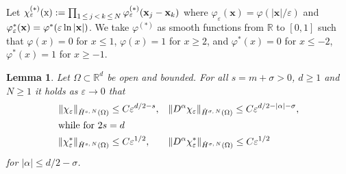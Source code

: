 \documentclass[10pt]{amsart}
\newtheorem{lemm}[theo]{Lemma}\newtheorem{prop}[theo]{Proposition}\newtheorem{coro}[theo]{Corollary}\newtheorem{conj}[theo]{Conjecture}
\theoremstyle{definition}\newtheorem{defi}[theo]{Definition}\newtheorem{rema}[theo]{Remark}\newtheorem{exam}[theo]{Example}\newtheorem{exem}[theo]{Example}\newtheorem{nota}[theo]{Notation}
\newcommand*\eps{\varepsilon}
\newcommand*\R {\mathbb{R}}
\newcommand\1{{\ensuremath {\mathds 1} }}
\newcommand{\bx}{\mathbf{x}}
\newcommand{\sx}{\textup{x}}
\begin{document}
Let $\chi_\eps^{(*)}(\sx) := \prod_{1\,\le\,j\,<\,k\,\le\,N} \varphi_\eps^{(*)}(\bx_j-\bx_k)$ where $\varphi_\eps(\bx) = \varphi(|\bx|/\eps)$ and $\varphi_\eps^*(\bx) \linebreak= \varphi^*(\eps\ln|\bx|)$. We take $\varphi^{(*)}$ as smooth functions from $\R$ to $[0,1]$ such that $\varphi(x) = 0$ for $x \le 1$, $\varphi(x) = 1$ for $x \ge 2$, and $\varphi^*(x) = 0$ for $x \le -2$, $\varphi^*(x) = 1$ for $x \ge -1$.

\begin{lemm}\label{lem:norm_of_cutoff}
Let $\Omega \subset \R^d$ be open and bounded. For all $s=m +\sigma > 0$, $d \ge 1$ and $N \ge 1$ it holds as $\eps \to 0$ that
\begin{align*}
\| \chi_\eps \|_{\dot{H}^{s,\,N}(\Omega)} &\le C \eps^{d/2-s},
& &\| D^\alpha \chi_\eps \|_{\dot{H}^{\sigma,\,N}(\Omega)} \le C \eps^{d/2-|\alpha|-\sigma},
\\
\intertext{while for $2s=d$}
\| \chi_\eps^* \|_{\dot{H}^{s,\,N}(\Omega)} &\le C \eps^{1/2},
& &\| D^\alpha \chi_\eps^* \|_{\dot{H}^{\sigma,\,N}(\Omega)} \le C \eps^{1/2}
\end{align*}
for $|\alpha| \le d/2-\sigma$.
\end{lemm}
\end{document}
